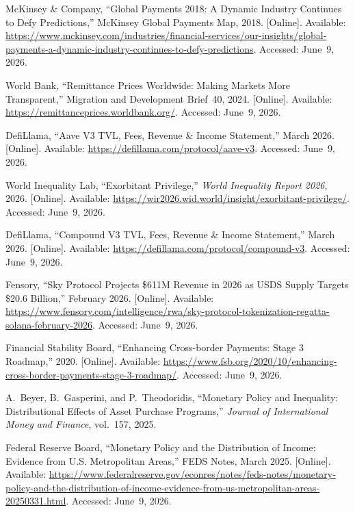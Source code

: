 \documentclass[12pt, a4paper]{report}
\begin{document}
{\begin{enumerate}[label={[\arabic*]}]
\item McKinsey \& Company, ``Global Payments 2018: A Dynamic Industry Continues to Defy Predictions,'' McKinsey Global Payments Map, 2018. [Online]. Available: \url{https://www.mckinsey.com/industries/financial-services/our-insights/global-payments-a-dynamic-industry-continues-to-defy-predictions}. Accessed: June~9, 2026.

\item World Bank, ``Remittance Prices Worldwide: Making Markets More Transparent,'' Migration and Development Brief~40, 2024. [Online]. Available: \url{https://remittanceprices.worldbank.org/}. Accessed: June~9, 2026.

\item DefiLlama, ``Aave V3 TVL, Fees, Revenue \& Income Statement,'' March 2026. [Online]. Available: \url{https://defillama.com/protocol/aave-v3}. Accessed: June~9, 2026.

\item World Inequality Lab, ``Exorbitant Privilege,'' \textit{World Inequality Report 2026}, 2026. [Online]. Available: \url{https://wir2026.wid.world/insight/exorbitant-privilege/}. Accessed: June~9, 2026.

\item DefiLlama, ``Compound V3 TVL, Fees, Revenue \& Income Statement,'' March 2026. [Online]. Available: \url{https://defillama.com/protocol/compound-v3}. Accessed: June~9, 2026.

\item Fensory, ``Sky Protocol Projects \$611M Revenue in 2026 as USDS Supply Targets \$20.6 Billion,'' February 2026. [Online]. Available: \url{https://www.fensory.com/intelligence/rwa/sky-protocol-tokenization-regatta-solana-february-2026}. Accessed: June~9, 2026.

\item Financial Stability Board, ``Enhancing Cross-border Payments: Stage 3 Roadmap,'' 2020. [Online]. Available: \url{https://www.fsb.org/2020/10/enhancing-cross-border-payments-stage-3-roadmap/}. Accessed: June~9, 2026.

\item A.~Beyer, B.~Gasperini, and P.~Theodoridis, ``Monetary Policy and Inequality: Distributional Effects of Asset Purchase Programs,'' \textit{Journal of International Money and Finance}, vol.~157, 2025.

\item Federal Reserve Board, ``Monetary Policy and the Distribution of Income: Evidence from U.S. Metropolitan Areas,'' FEDS Notes, March 2025. [Online]. Available: \url{https://www.federalreserve.gov/econres/notes/feds-notes/monetary-policy-and-the-distribution-of-income-evidence-from-us-metropolitan-areas-20250331.html}. Accessed: June~9, 2026.


\end{enumerate}}
\end{document}
